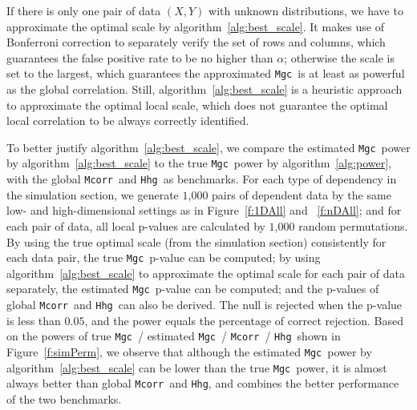 \documentclass[11pt]{article}
\providecommand{\sct}[1]{{\sc \texttt{#1}}}
\newcommand{\Mgc}{\sct{Mgc}}
\newcommand{\Hhg}{\sct{Hhg}}
\newcommand{\Mcorr}{\sct{Mcorr}}
\begin{document}
If there is only one pair of data $(X,Y)$ with unknown distributions, we have to approximate the optimal scale by algorithm~\ref{alg:best_scale}. It makes use of Bonferroni correction to separately verify the set of rows and columns, which guarantees the false positive rate to be no higher than $\alpha$; otherwise the scale is set to the largest, which guarantees the approximated \Mgc~is at least as powerful as the global correlation. Still, algorithm~\ref{alg:best_scale} is a heuristic approach to approximate the optimal local scale, which does not guarantee the optimal local correlation to be always correctly identified.


To better justify algorithm~\ref{alg:best_scale}, we compare the estimated \Mgc~power by algorithm~\ref{alg:best_scale} to the true \Mgc~power by algorithm~\ref{alg:power}, with the global \Mcorr~and \Hhg~as benchmarks. For each type of dependency in the simulation section, we generate $1$,$000$ pairs of dependent data by the same low- and high-dimensional settings as in Figure~\ref{f:1DAll} and ~\ref{f:nDAll}; and for each pair of data, all local p-values are calculated by $1$,$000$ random permutations. By using the true optimal scale (from the simulation section) consistently for each data pair, the true \Mgc~p-value can be computed; by using algorithm~\ref{alg:best_scale} to approximate the optimal scale for each pair of data separately, the estimated \Mgc~p-value can be computed; and the p-values of global \Mcorr~and \Hhg~can also be derived. The null is rejected when the p-value is less than $0.05$, and the power equals the percentage of correct rejection. Based on the powers of true \Mgc~/ estimated \Mgc~/ \Mcorr~/ \Hhg~shown in Figure~\ref{f:simPerm}, we observe that although the estimated \Mgc~power by algorithm~\ref{alg:best_scale} can be lower than the true \Mgc~power, it is almost always better than global \Mcorr~and \Hhg, and combines the better performance of the two benchmarks.
\end{document}
